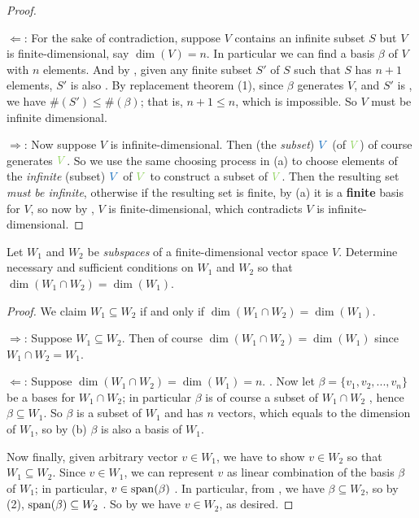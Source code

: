 \begin{proof} \ 

\(\Longleftarrow\): For the sake of contradiction, suppose \(V\) contains an infinite \LID{} subset \(S\) but \(V\) is finite-dimensional, say \(\dim(V) = n\).
In particular we can find a basis \(\beta\) of \(V\) with \(n\) elements.
And by , given any finite subset \(S'\) of \(S\) such that \(S\) has \(n + 1\) elements, \(S'\) is also \LID{}.
By replacement theorem (1), since \(\beta\) generates \(V\), and \(S'\) is \LID{}, we have \(\#(S') \le \#(\beta)\);
that is, \(n + 1 \le n\), which is impossible.
So \(V\) must be infinite dimensional.

\(\Longrightarrow\):
Now suppose \(V\) is infinite-dimensional.
Then (the \emph{subset}) \(\BLUE{V}\) (of \(\GREEN{V}\)) of course generates \(\GREEN{V}\).
So we use the same choosing process in (a) to choose elements of the \emph{infinite} (subset) \(\BLUE{V}\) of \(\GREEN{V}\) to construct a \LID{} subset of \(\GREEN{V}\).
Then the resulting set \emph{must be infinite}, otherwise if the resulting set is finite, by (a) it is a \textbf{finite} basis for \(V\), so now by , \(V\) is finite-dimensional, which contradicts \(V\) is infinite-dimensional.
\end{proof}

\begin{exercise} \label{exercise 1.6.22}
Let \(W_1\) and \(W_2\) be \emph{subspaces} of a finite-dimensional vector space \(V\).
Determine necessary and sufficient conditions on \(W_1\) and \(W_2\) so that \(\dim(W_1 \cap W_2) = \dim(W_1)\).
\end{exercise}

\begin{proof}
We claim \(W_1 \subseteq W_2\) if and only if \(\dim(W_1 \cap W_2) = \dim(W_1)\).

\(\Longrightarrow\): Suppose \(W_1 \subseteq W_2\).
Then of course \(\dim(W_1 \cap W_2) = \dim(W_1)\) since \(W_1 \cap W_2 = W_1\).

\(\Longleftarrow\):
Suppose \(\dim(W_1 \cap W_2) = \dim(W_1) = n\). .
Now let \(\beta = \{ v_1, v_2, ..., v_n \}\) be a bases for \(W_1 \cap W_2\); in particular \(\beta\) is of course a subset of \(W_1 \cap W_2\) , hence \(\beta \subseteq W_1\).
So \(\beta\) is a \LID{} subset of \(W_1\) and has \(n\) vectors, which equals to the dimension of \(W_1\), so by (b) \(\beta\) is also a basis of \(W_1\).

Now finally, given arbitrary vector \(v \in W_1\), we have to show \(v \in W_2\) so that \(W_1 \subseteq W_2\).
Since \(v \in W_1\), we can represent \(v\) as linear combination of the basis \(\beta\) of \(W_1\); in particular, \(v \in \operatorname{span}(\beta)\) .
In particular, from , we have \(\beta \subseteq W_2\), so by (2), \(\operatorname{span}(\beta) \subseteq W_2\) .
So by  we have \(v \in W_2\), as desired.
\end{proof}

